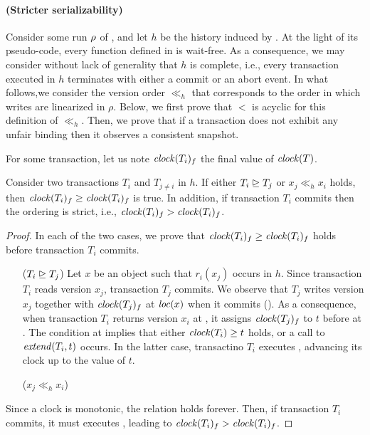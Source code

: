 \paragraph{(Stricter serializability)}
Consider some run $\run$ of , and let $h$ be the history induced by \run.
At the light of its pseudo-code, every function defined in  is wait-free.
As a consequence, we may consider without lack of generality that $h$ is complete, i.e., every transaction executed in $h$ terminates with either a commit or an abort event.
In what follows,we consider the version order $\ll_h$ that corresponds to the order in which writes are linearized in $\rho$.
Below, we first prove that $<$ is acyclic for this definition of $\ll_h$.
Then, we prove that if a transaction does not exhibit any unfair binding then it observes a consistent snapshot.

For some transaction, let us note $\clockOf{T_i}_f$ the final value of $\clockOf{T}$.

\begin{proposition}
  Consider two transactions $T_i$ and $T_{j \neq i}$ in $h$.
  If either $T_i \mathrel{\unrhd} T_j$ or  $x_j \ll_h x_i$ holds, then $\clockOf{T_i}_f \geq \clockOf{T_i}_f$ is true.
  In addition, if transaction $T_i$ commits then the ordering is strict, i.e., $\clockOf{T_i}_f > \clockOf{T_i}_f$.
\end{proposition}

\begin{proof}

  In each of the two cases, we prove that $\clockOf{T_i}_f \geq \clockOf{T_i}_f$ holds before transaction $T_i$ commits.
  \begin{itemize}
  \item[($T_i \mathrel{\unrhd} T_j$)]
    Let $x$ be an object such that $r_i(x_j)$ occurs in $h$.
    Since transaction $T_i$ reads version $x_j$, transaction $T_j$ commits.
    We observe that $T_j$ writes version $x_j$ together with $\clockOf{T_j}_f$ at $\locationOf{x}$ when it commits ().
    As a consequence, when transaction $T_i$ returns version $x_i$ at , it assigns $\clockOf{T_j}_f$ to $t$ before at .
    The condition at  implies that either $\clockOf{T_i} \geq t$ holds, or a call to $\stmExtend{T_i,t}$ occurs.
    In the latter case, transactino $T_i$ executes , advancing its clock up to the value of $t$.
  \item[($x_j \ll_h x_i$)]
    
  \end{itemize}
  Since a clock is monotonic, the relation holds forever.
  Then, if transaction $T_i$ commits, it must executes , leading to $\clockOf{T_i}_f > \clockOf{T_i}_f$.
\end{proof}

